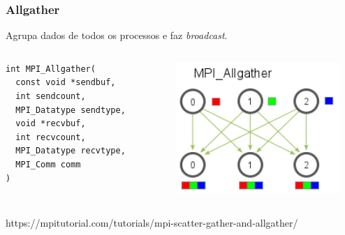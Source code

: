 \documentclass[xcolor={usenames,dvipsnames},12pt,presentation,aspectratio=169]{beamer}
\begin{document}
\begin{frame}[fragile]
  \frametitle{Allgather}
Agrupa dados de todos os processos e faz \emph{broadcast}.
\begin{columns}
  \begin{column}{0.5\textwidth}
    \begin{center}
      \begin{minipage}{0.95\textwidth}
        \begin{verbatim}
int MPI_Allgather(
  const void *sendbuf,
  int sendcount,
  MPI_Datatype sendtype,
  void *recvbuf,
  int recvcount,
  MPI_Datatype recvtype,
  MPI_Comm comm
)
        \end{verbatim}
      \end{minipage}
      \end{center}    
  \end{column}
  \begin{column}{0.5\textwidth}
    \begin{center}
    \includegraphics[width=0.9\textwidth]{allgather.png}
    \end{center}       
  \end{column}
\end{columns}
{\tiny https://mpitutorial.com/tutorials/mpi-scatter-gather-and-allgather/}
\end{frame}
\end{document}
